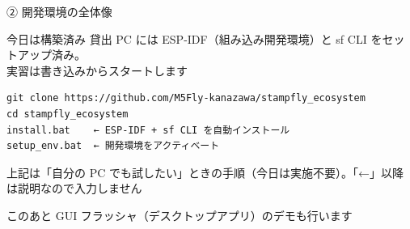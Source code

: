 
\begin{frame}[fragile]{② 開発環境の全体像}
  \begin{block}{今日は構築済み}
    \footnotesize 貸出 PC には ESP-IDF（組み込み開発環境）と sf CLI をセットアップ済み。\\
    実習は書き込みからスタートします
  \end{block}

  \begin{lstlisting}[style=sfbash, numbers=none]
git clone https://github.com/M5Fly-kanazawa/stampfly_ecosystem
cd stampfly_ecosystem
install.bat    ← ESP-IDF + sf CLI を自動インストール
setup_env.bat  ← 開発環境をアクティベート
  \end{lstlisting}

  {\footnotesize 上記は「自分の PC でも試したい」ときの手順（今日は実施不要）。「←」以降は説明なので入力しません}

  \vspace{0.2em}

  \begin{exampleblock}{このあと}
    \footnotesize GUI フラッシャ（デスクトップアプリ）のデモも行います
  \end{exampleblock}
\end{frame}

